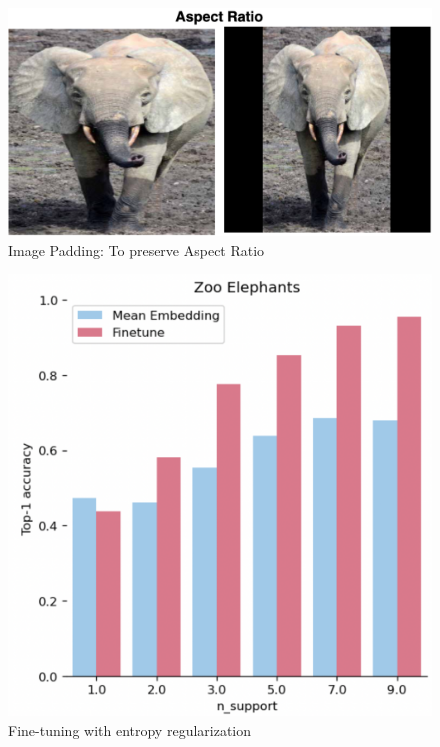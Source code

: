 \documentclass[10pt,twocolumn,letterpaper]{article}
\begin{document}
\begin{figure}[t]
  \centering
  \includegraphics[scale=0.23]{image_padding}
   \caption{Image Padding: To preserve Aspect Ratio}
   \label{fig:image_padding}
\end{figure}

\begin{figure}[t]
  \centering
  \includegraphics[scale=0.50]{finetune_graph}
   \caption{Fine-tuning with entropy regularization}
   \label{fig:finetune_graph}
\end{figure}
\end{document}
